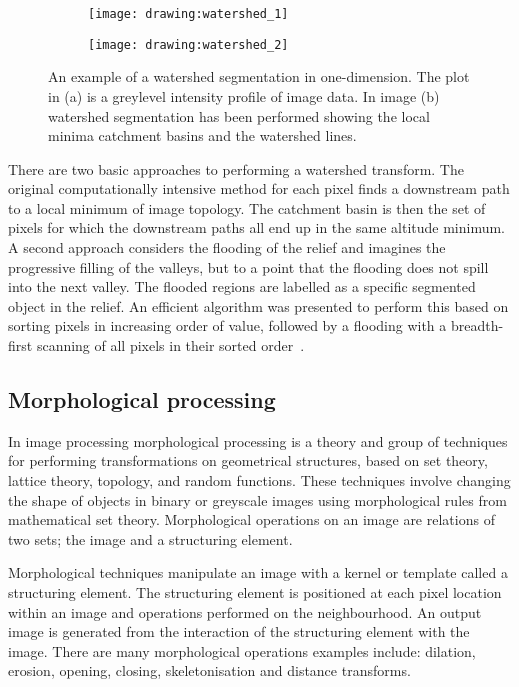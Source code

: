 \begin{figure}[htbp!]\centering
	\begin{subfigure}[b]{0.48\linewidth}
		\centering
		\texttt{[image: drawing:watershed\_1]}
		\caption{}
		\label{figure:introduction:watershed_1}
	\end{subfigure}
	\begin{subfigure}[b]{0.48\linewidth}
		\centering
		\texttt{[image: drawing:watershed\_2]}
		\caption{}
		\label{figure:introduction:watershed_2}
	\end{subfigure}
\caption[Watershed]{An example of a watershed segmentation in one-dimension. The plot in (a) is a greylevel intensity profile of image data. In image (b) watershed segmentation has been performed showing the local minima catchment basins and the watershed lines.}
\label{figure:introduction:watershed}
\end{figure}

There are two basic approaches to performing a watershed transform. The original computationally intensive method for each pixel finds a downstream path to a local minimum of image topology. The catchment basin is then the set of pixels for which the downstream paths all end up in the same altitude minimum. A second approach considers the flooding of the relief and imagines the progressive filling of the valleys, but to a point that the flooding does not spill into the next valley. The flooded regions are labelled as a specific segmented object in the relief. An efficient algorithm was presented to perform this based on sorting pixels in increasing order of value, followed by a flooding with a breadth-first scanning of all pixels in their sorted order~\cite{Vincent1991}.

\subsection{Morphological processing}
\label{introduction:image_processing:morphological_processing}
In image processing morphological processing is a theory and group of techniques for performing transformations on geometrical structures, based on set theory, lattice theory, topology, and random functions. These techniques involve changing the shape of objects in binary or greyscale images using morphological rules from mathematical set theory. Morphological operations on an image are relations of two sets; the image and a structuring element.

Morphological techniques manipulate an image with a kernel or template called a structuring element. The structuring element is positioned at each pixel location within an image and operations performed on the neighbourhood. An output image is generated from the interaction of the structuring element with the image. There are many morphological operations examples include: dilation, erosion, opening, closing, skeletonisation and distance transforms.

